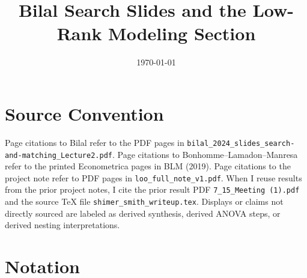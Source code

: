 \documentclass[11pt]{article}
\title{Bilal Search Slides and the Low-Rank Modeling Section}
\author{}
\date{\today}
\newcommand{\1}{\mathbf{1}}
\begin{document}
\maketitle

\section*{Source Convention}

Page citations to Bilal refer to the PDF pages in
\texttt{bilal\_2024\_slides\_search-and-matching\_Lecture2.pdf}. Page citations
to Bonhomme--Lamadon--Manresa refer to the printed Econometrica pages in BLM
(2019). Page citations to the project note refer to PDF pages in
\texttt{loo\_full\_note\_v1.pdf}. When I reuse results from the prior project
notes, I cite the prior result PDF \texttt{7\_15\_Meeting (1).pdf} and the
source \TeX{} file \texttt{shimer\_smith\_writeup.tex}. Displays or claims not
directly sourced are labeled as derived synthesis, derived ANOVA steps, or
derived nesting interpretations.

\section{Notation}
\end{document}
